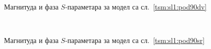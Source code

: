 \documentclass[main.tex]{subfiles}
\begin{document}
\begin{figure}[!t]
\centering
{}\\
\caption{Магнитуда и фаза $S$-параметара за модел са сл.~\ref{tsm:sl1:pod90dv}}
\label{tsm:rez:pod90dv}
\end{figure}
\begin{figure}[!t]
\centering
{}\\
\caption{Магнитуда и фаза $S$-параметара за модел са сл.~\ref{tsm:sl1:pod90sr}}
\label{tsm:rez:pod90sr}
\end{figure}
\end{document}
